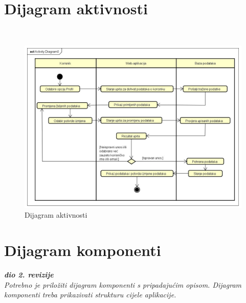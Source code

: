 			\section{Dijagram aktivnosti}
			
			\textbf{\textit{}}\\
			
			\begin{figure}[H]
				\includegraphics[scale=0.4]{slike/Dijagram_aktivnosti_promjena_podataka.jpeg} %
				\centering
				\caption{Dijagram aktivnosti}
				\label{fig:dijagramAktivnosti}
			\end{figure}
			
			
			\eject 
			\section{Dijagram komponenti}
			
			\textbf{\textit{dio 2. revizije}}\\
			
			\textit{Potrebno je priložiti dijagram komponenti s pripadajućim opisom. Dijagram komponenti treba prikazivati strukturu cijele aplikacije.}
		
